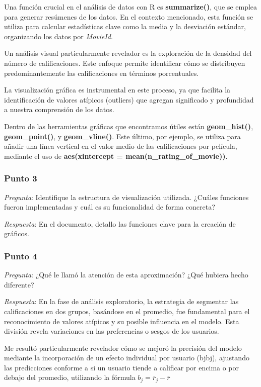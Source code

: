 \documentclass[
]{article}
\begin{document}
Una función crucial en el análisis de datos con R es
\textbf{summarize()}, que se emplea para generar resúmenes de los datos.
En el contexto mencionado, esta función se utiliza para calcular
estadísticas clave como la media y la desviación estándar, organizando
los datos por \emph{MovieId}.

Un análisis visual particularmente revelador es la exploración de la
densidad del número de calificaciones. Este enfoque permite identificar
cómo se distribuyen predominantemente las calificaciones en términos
porcentuales.

La visualización gráfica es instrumental en este proceso, ya que
facilita la identificación de valores atípicos (outliers) que agregan
significado y profundidad a nuestra comprensión de los datos.

Dentro de las herramientas gráficas que encontramos útiles están
\textbf{geom\_hist()}, \textbf{geom\_point()}, y \textbf{geom\_vline()}.
Este último, por ejemplo, se utiliza para añadir una línea vertical en
el valor medio de las calificaciones por película, mediante el uso de
\textbf{aes(xintercept = mean(n\_rating\_of\_movie))}.

\subsubsection{Punto 3}\label{punto-3}

\emph{Pregunta}: Identifique la estructura de visualización utilizada.
¿Cuáles funciones fueron implementadas y cuál es su funcionalidad de
forma concreta?

\emph{Respuesta}: En el documento, detallo las funciones clave para la
creación de gráficos.

\subsubsection{Punto 4}\label{punto-4}

\emph{Pregunta}: ¿Qué le llamó la atención de esta aproximación? ¿Qué
hubiera hecho diferente?

\emph{Respuesta}: En la fase de análisis exploratorio, la estrategia de
segmentar las calificaciones en dos grupos, basándose en el promedio,
fue fundamental para el reconocimiento de valores atípicos y su posible
influencia en el modelo. Esta división revela variaciones en las
preferencias o sesgos de los usuarios.

Me resultó particularmente revelador cómo se mejoró la precisión del
modelo mediante la incorporación de un efecto individual por usuario
(bjbj\hspace{0pt}), ajustando las predicciones conforme a si un usuario
tiende a calificar por encima o por debajo del promedio, utilizando la
fórmula \(b_j = \bar{r}_j - \bar{r}\)
\end{document}
